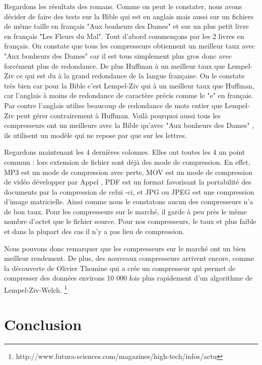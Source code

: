 \documentclass{report}
\begin{document}
Regardons les résultats des romans. Comme on peut le constater, nous avons décider de faire des tests sur la Bible qui est en anglais mais aussi sur un fichiers de même taille en français "Aux bonheurs des Dames" et sur un plus petit livre en français "Les Fleurs du Mal". Tout d'abord commençons par les 2 livres en français. On constate que tous les compresseurs obtiennent un meilleur taux avec "Aux bonheurs des Dames" car il est tous simplement plus gros donc avec forcément plus de redondance. De plus Huffman à un meilleur taux que Lempel-Ziv ce qui est du à la grand redondance de la langue française. 
On le constate très bien car pour la Bible c'est Lempel-Ziv qui à un meilleur taux que Huffman, car l'anglais à moins de redondance de caractère précis comme le "e" en français. Par contre l'anglais utilise beaucoup de redondance de mots entier que Lempel-Ziv peut gérer contrairement à Huffman.
Voilà pourquoi aussi tous les compresseurs ont un meilleurs avec la Bible qu'avec "Aux bonheurs des Dames" , ils utilisent un modèle qui ne repose par que sur les lettres. 

Regardons maintenant les 4 dernières colonnes. Elles ont toutes les 4 un point commun : lors extension de fichier sont déjà des mode de compression. En effet, MP3 est un mode de compression avec perte, MOV est un mode de compression de vidéo développer par Appel , PDF est un format favorisant la portabilité des documents par la compression de celui -ci, et JPG ou JPEG est une compression d'image matricielle. Ainsi comme nous le constatons aucun des compresseurs n'a de bon taux. Pour les compresseurs sur le marché, il garde à peu près le même nombre d'octet que le fichier source. Pour nos compresseurs, le taux et plus faible et dans la plupart des cas il n'y a pas lieu de compression. 

Nous pouvons donc remarquer que les compresseurs sur le marché ont un bien meilleur rendement.
De plus, des nouveaux compresseurs arrivent encore, comme la découverte de Olivier Thomine qui a crée un compresseur qui permet de compresser des données environs 10 000 fois plus rapidement d'un algorithme de Lempel-Ziv-Welch. \footnote{http://www.futura-sciences.com/magazines/high-tech/infos/actu}


\section*{Conclusion}
\end{document}
